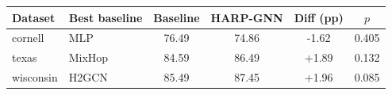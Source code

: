 \begin{tabular}{llcccc}
\toprule
Dataset & Best baseline & Baseline & HARP-GNN & Diff (pp) & $p$ \\
\midrule
cornell & MLP & 76.49 & 74.86 & -1.62 & 0.405 \\
texas & MixHop & 84.59 & 86.49 & +1.89 & 0.132 \\
wisconsin & H2GCN & 85.49 & 87.45 & +1.96 & 0.085 \\
\bottomrule
\end{tabular}
